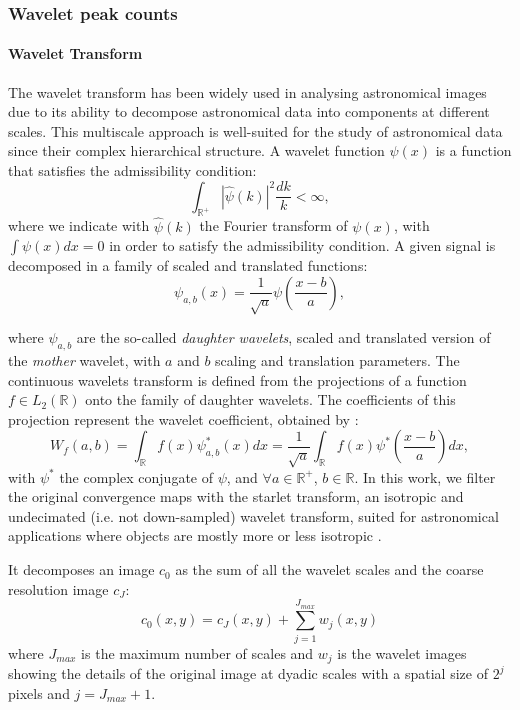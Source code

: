 \documentclass[twocolumn,twocolappendix]{aastex63}
\begin{document}
\subsubsection{Wavelet peak counts}
\paragraph{Wavelet Transform} The wavelet transform has been widely used in analysing astronomical images due to its ability to decompose astronomical data into components at different scales. 
This multiscale approach is well-suited for the study of astronomical data since their complex hierarchical structure. A wavelet function $\psi(x)$ is a function that satisfies the admissibility condition:
\begin{equation}
    \int_{\mathbb{R}^{+}} |\hat{\psi}(k)|^2 \frac{dk}{k}<\infty,
\end{equation}
where we indicate with $\hat{\psi}(k)$ the Fourier transform of $\psi(x)$, with $\int\psi(x)dx=0$ in order to satisfy the admissibility condition. 
A given signal is decomposed in a family of scaled and translated functions:
\begin{equation}
    \psi_{a,b}(x)=\frac{1}{\sqrt{a}}\psi \left( \frac{x-b}{a}\right),
\end{equation}

where $\psi_{a,b}$ are the so-called \textit{daughter wavelets}, scaled and translated version of the \textit{mother} wavelet, with $a$ and $b$ scaling and translation parameters.
The continuous wavelets transform is defined from the projections of a function $f \in L_2(\mathbb{R})$ onto the family of daughter wavelets. The coefficients of this projection represent the wavelet coefficient, obtained by :
\begin{equation}
    W_f(a,b)=\int_{\mathbb{R}} f(x)\psi^{*}_{a,b}(x)dx=\frac{1}{\sqrt{a}}\int_{\mathbb{R}}f(x)\psi^{*}\left( \frac{x-b}{a}\right)dx ,
\end{equation}
with $\psi^{*}$ the complex conjugate of $\psi$, and $ \forall a \in \mathbb{R}^{+}$, $ b \in \mathbb{R.}$  
In this work, we filter the original convergence maps with the starlet transform, an isotropic and undecimated (i.e. not down-sampled)  wavelet transform, suited for astronomical applications where objects are mostly more or less isotropic \citep{4060954}.

It decomposes an image $c_0$ as the sum of all the wavelet scales and the coarse resolution image $c_J$:
\begin{equation}\label{wav_des}
    c_0(x,y)=c_J(x,y)+\sum_{j=1}^{J_{max}} w_j(x,y)
\end{equation}
where $J_{max}$ is the maximum number of scales and $w_j$ is the wavelet images showing the details of the original image at dyadic scales with a spatial size of $2^j$ pixels and $j = J_{max} + 1$. 
\end{document}
